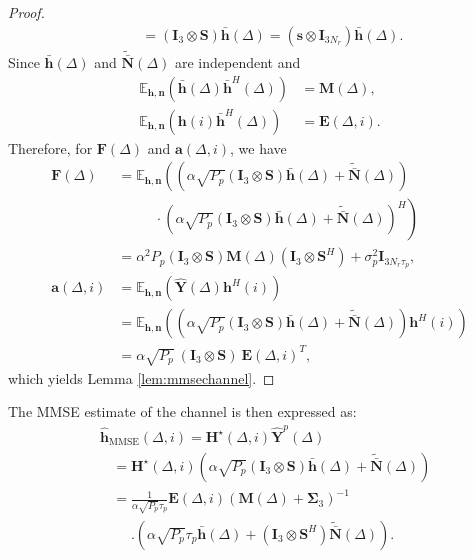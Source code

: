 \documentclass[conference, a4paper, 10pt]{IEEEtran}
\newcommand{\mx}[1]{\mathbf{#1}}
\begin{document}
\begin{proof}
\begin{align}
~~~~~~~~= (\mx{I}_3\otimes\mx{S}) \mx{\bar h}(\Delta)=  (\mx{s}\otimes \mx{I}_{3N_r}) \mx{\bar h}(\Delta).
\end{align}
Since $\mx{\bar h}(\Delta)$ and $\mx{\tilde{\bar{N}}}(\Delta)$ are independent and
\begin{align}
\mathds{E}_{\mathbf{h},\mathbf{n}}(\mx{\bar h}(\Delta)\mx{\bar h}^H(\Delta))&=\mx{M}(\Delta),\\
\mathds{E}_{\mathbf{h},\mathbf{n}}(\mx{h}(i)\mx{\bar h}^H(\Delta))&=\mx{E}(\Delta,i).
\end{align}
Therefore, for $\mx{F}(\Delta)$ and $\mx{a}(\Delta,i)$, we have
\begin{align*}
\mx{F}(\Delta) &=
\mathds{E}_{\mathbf{h},\mathbf{n}}
\left(\left(\alpha\sqrt{P_p} (\mx{I}_3\otimes\mx{S}) \mx{\bar{h}}(\Delta) +\mx{\tilde{\bar{N}}}(\Delta)\right)\right.\nonumber \\
&~~~~~~~~~~~~\cdot \left.\left(\alpha\sqrt{P_p} (\mx{I}_3\otimes\mx{S}) \mx{\bar{h}}(\Delta) +\mx{\tilde{\bar{N}}}(\Delta)\right)^H\right)\\
&=\alpha^2P_p(\mx{I}_3\otimes\mx{S})\mx{M}(\Delta)\left(\mx{I}_3\otimes\mx{S}^H\right)+ \sigma_p^2 \mathbf{I}_{3N_r\tau_p},\\
\mx{a}(\Delta, i) &= \mathds{E}_{\mathbf{h},\mathbf{n}}\left( \mx{\hat Y}(\Delta) \mx{h}^{H}(i)\right) \\
&=\mathds{E}_{\mathbf{h},\mathbf{n}}
\left(\left(\alpha\sqrt{P_p} (\mx{I}_3\otimes\mx{S}) \mx{\bar{h}}(\Delta) +\mx{\tilde{\bar{N}}}(\Delta)\right)
\mx{h}^{H}(i)\right)\\
&= \alpha\sqrt{P_p} ~(\mx{I}_3\otimes\mx{S})~\mx{E}(\Delta,i)^T,
\end{align*}
which yields Lemma \ref{lem:mmsechannel}.
\end{proof}

The \ac{MMSE} estimate of the channel is then expressed as:
\begin{align}
\nonumber
&\mathbf{\hat h}_{\textrm{MMSE}}(\Delta, i)=\mathbf{H^\star}(\Delta, i) \mathbf{\hat Y}^p(\Delta) ~~~~ \\
&~~~~=\mathbf{H^\star}(\Delta, i)
\left(\alpha\sqrt{P_p} (\mx{I}_3\otimes\mx{S}) \mx{\bar{h}}(\Delta) +\mx{\tilde{\bar{N}}}(\Delta)\right)
\nonumber
\\
&~~~~=
\frac{1}{\alpha\sqrt{P_p} \tau_p}
\mx{E}(\Delta, i) \left(   \mx{M}(\Delta) + \mx{\Sigma}_{3} \right)^{-1}
\nonumber
\\&~~~~~~~~~~.
\left(\alpha\sqrt{P_p} \tau_p \mx{\bar{h}}(\Delta) + \left(\mx{I}_3 \otimes \mx{S}^H\right) \mx{\tilde{\bar{N}}}(\Delta)\right).
\label{eq:MMSEt}
\end{align}
\end{document}
